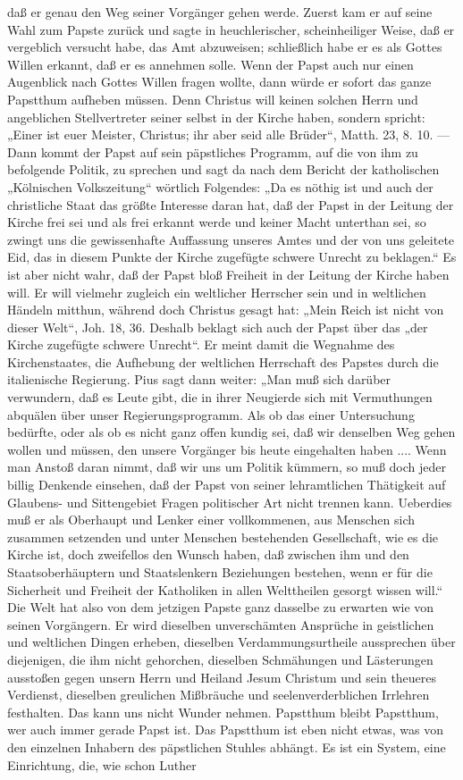 daß er genau den Weg seiner Vorgänger gehen werde. Zuerst kam er auf seine Wahl zum Papste zurück und sagte in heuchlerischer, scheinheiliger Weise, daß er vergeblich versucht habe, das Amt abzuweisen; schließlich habe er es als Gottes Willen erkannt, daß er es annehmen solle. Wenn der Papst auch nur einen Augenblick nach Gottes Willen fragen wollte, dann würde er sofort das ganze Papstthum aufheben müssen. Denn Christus will keinen solchen Herrn und angeblichen Stellvertreter seiner selbst in der Kirche haben, sondern spricht: „Einer ist euer Meister, Christus; ihr aber seid alle Brüder“, Matth. 23, 8. 10. — Dann kommt der Papst auf sein päpstliches Programm, auf die von ihm zu befolgende Politik, zu sprechen und sagt da nach dem Bericht der katholischen „Kölnischen Volkszeitung“ wörtlich Folgendes: „Da es nöthig ist und auch der christliche Staat das größte Interesse daran hat, daß der Papst in der Leitung der Kirche frei sei und als frei erkannt werde und keiner Macht unterthan sei, so zwingt uns die gewissenhafte Auffassung unseres Amtes und der von uns geleitete Eid, das in diesem Punkte der Kirche zugefügte schwere Unrecht zu beklagen.“ Es ist aber nicht wahr, daß der Papst bloß Freiheit in der Leitung der Kirche haben will. Er will vielmehr zugleich ein weltlicher Herrscher sein und in weltlichen Händeln mitthun, während doch Christus gesagt hat: „Mein Reich ist nicht von dieser Welt“, Joh. 18, 36. Deshalb beklagt sich auch der Papst über das „der Kirche zugefügte schwere Unrecht“. Er meint damit die Wegnahme des Kirchenstaates, die Aufhebung der weltlichen Herrschaft des Papstes durch die italienische Regierung. Pius sagt dann weiter: „Man muß sich darüber verwundern, daß es Leute gibt, die in ihrer Neugierde sich mit Vermuthungen abquälen über unser Regierungsprogramm. Als ob das einer Untersuchung bedürfte, oder als ob es nicht ganz offen kundig sei, daß wir denselben Weg gehen wollen und müssen, den unsere Vorgänger bis heute eingehalten haben .... Wenn man Anstoß daran nimmt, daß wir uns um Politik kümmern, so muß doch jeder billig Denkende einsehen, daß der Papst von seiner lehramtlichen Thätigkeit auf Glaubens- und Sittengebiet Fragen politischer Art nicht trennen kann. Ueberdies muß er als Oberhaupt und Lenker einer vollkommenen, aus Menschen sich zusammen setzenden und unter Menschen bestehenden Gesellschaft, wie es die Kirche ist, doch zweifellos den Wunsch haben, daß zwischen ihm und den Staatsoberhäuptern und Staatslenkern Beziehungen bestehen, wenn er für die Sicherheit und Freiheit der Katholiken in allen Welttheilen gesorgt wissen will.“ Die Welt hat also von dem jetzigen Papste ganz dasselbe zu erwarten wie von seinen Vorgängern. Er wird dieselben unverschämten Ansprüche in geistlichen und weltlichen Dingen erheben, dieselben Verdammungsurtheile aussprechen über diejenigen, die ihm nicht gehorchen, dieselben Schmähungen und Lästerungen ausstoßen gegen unsern Herrn und Heiland Jesum Christum und sein theueres Verdienst, dieselben greulichen Mißbräuche und seelenverderblichen Irrlehren festhalten. Das kann uns nicht Wunder nehmen. Papstthum bleibt Papstthum, wer auch immer gerade Papst ist. Das Papstthum ist eben nicht etwas, was von den einzelnen Inhabern des päpstlichen Stuhles abhängt. Es ist ein System, eine Einrichtung, die, wie schon Luther 